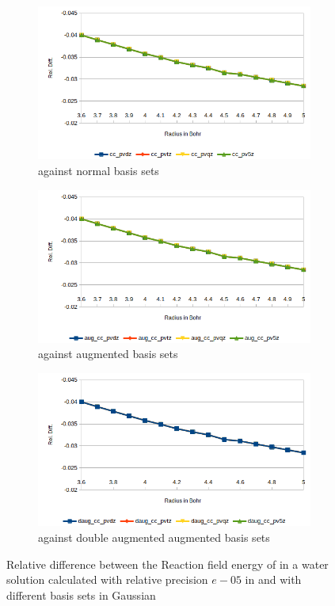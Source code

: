 \documentclass[../master_thesis.tex]{subfiles}
\begin{document}
\begin{figure}[h!]
  \centering
  \begin{subfigure}[b]{0.75\linewidth}
    \includegraphics[width=\linewidth]{img/lipreldiff.png}
    \caption{\mrchem against normal basis sets}
  \end{subfigure}
  \begin{subfigure}[b]{0.75\linewidth}
    \includegraphics[width=\linewidth]{img/lipaugreldiff.png}
    \caption{\mrchem against augmented basis sets}
  \end{subfigure}
  \begin{subfigure}[b]{0.75\linewidth}
    \includegraphics[width=\linewidth]{img/lipdaugreldiff.png}
    \caption{\mrchem against double augmented augmented basis sets}
  \end{subfigure}
  \caption[Relative difference between methods for ]{Relative difference between the Reaction field energy of in a water solution calculated with relative precision $e-05$ in \mrchem
  and with different basis sets in Gaussian}
  \label{fig:lipreldiff}
\end{figure}
\end{document}
